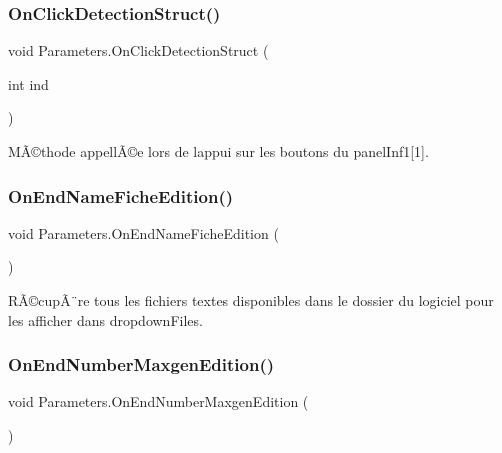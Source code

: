 \mbox{\label{class_parameters_ad62219d943618c3b970a46239ae443ae}} 
\subsubsection{\texorpdfstring{On\+Click\+Detection\+Struct()}{OnClickDetectionStruct()}}
{\footnotesize\ttfamily void Parameters.\+On\+Click\+Detection\+Struct (\begin{DoxyParamCaption}\item[{int}]{ind }\end{DoxyParamCaption})\hspace{0.3cm}{\ttfamily [inline]}}



MÃ©thode appellÃ©e lors de l\textquotesingle{}appui sur les boutons du panel\+Inf1\mbox{[}1\mbox{]}. 

\mbox{\label{class_parameters_ad3db64cd1a228cb925a9afd7f32332a5}} 
\subsubsection{\texorpdfstring{On\+End\+Name\+Fiche\+Edition()}{OnEndNameFicheEdition()}}
{\footnotesize\ttfamily void Parameters.\+On\+End\+Name\+Fiche\+Edition (\begin{DoxyParamCaption}{ }\end{DoxyParamCaption})\hspace{0.3cm}{\ttfamily [inline]}}



RÃ©cupÃ¨re tous les fichiers textes disponibles dans le dossier du logiciel pour les afficher dans dropdown\+Files. 

\mbox{\label{class_parameters_a4167680889821ca1d2f3bc487b0bebae}} 
\subsubsection{\texorpdfstring{On\+End\+Number\+Maxgen\+Edition()}{OnEndNumberMaxgenEdition()}}
{\footnotesize\ttfamily void Parameters.\+On\+End\+Number\+Maxgen\+Edition (\begin{DoxyParamCaption}{ }\end{DoxyParamCaption})\hspace{0.3cm}{\ttfamily [inline]}}



